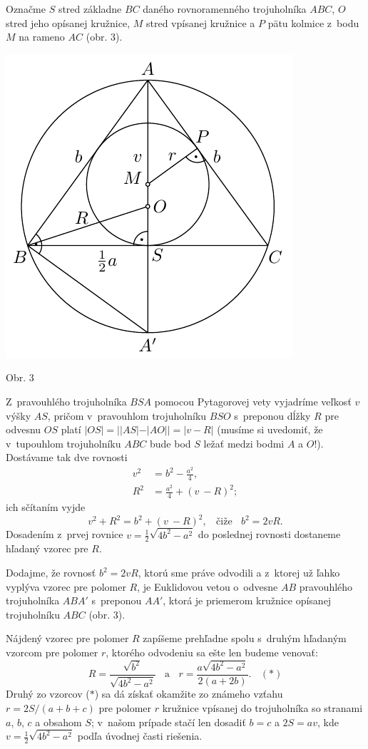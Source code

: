 \rieh Označme $S$ stred základne $BC$ daného rovnoramenného trojuholníka $ABC$, $O$ stred jeho opísanej kružnice, $M$ stred vpísanej kružnice a $P$ pätu kolmice z~bodu $M$ na rameno $AC$ (obr. 3).
\begin{center}
\includegraphics{obrazky/61D5}

Obr. 3
\end{center}
Z~pravouhlého trojuholníka $BSA$ pomocou Pytagorovej vety vyjadríme veľkosť $v$ výšky $AS$, pričom v~pravouhlom trojuholníku $BSO$ s~preponou dĺžky $R$ pre odvesnu $OS$ platí $|OS| =||AS|-|AO|| = |v-R|$ (musíme si uvedomiť, že v~tupouhlom trojuholníku $ABC$ bude bod $S$ ležať medzi bodmi $A$ a $O$!). Dostávame tak dve rovnosti
\begin{align*}
v^2 &= b^2 -\frac{a^2}{4},\\
R^2 &= \frac{a^2}{4}+ (v~-R)^2;
\end{align*}
ich sčítaním vyjde
$$v^2+ R^2= b^2 + (v~- R)^2,\ \ \ \ \text{čiže} \ \ \ \  b^2= 2vR.$$
Dosadením z~prvej rovnice $v =\frac{1}{2}\sqrt{4b^2- a^2}$ do poslednej rovnosti dostaneme hľadaný vzorec pre $R$.

Dodajme, že rovnosť $b^2 = 2vR$, ktorú sme práve odvodili a z~ktorej už ľahko vyplýva vzorec pre polomer $R$, je Euklidovou vetou o~odvesne $AB$ pravouhlého trojuholníka $ABA'$ s~preponou $AA'$, ktorá je priemerom kružnice opísanej trojuholníku $ABC$ (obr. 3).

Nájdený vzorec pre polomer $R$ zapíšeme prehľadne spolu s~druhým hľadaným vzorcom pre polomer $r$, ktorého odvodeniu sa ešte len budeme venovať:
$$R =\frac{\sqrt{b^2}}{\sqrt{4b^2 - a^2}}\ \ \ \ \text{a}\ \ \ \  r = \frac{a\sqrt{4b^2-a^2}}{2(a+2b)}.\ \ \ \  (\ast)$$
Druhý zo vzorcov ($\ast$) sa dá získať okamžite zo známeho vzťahu $r = 2S/(a + b + c)$ pre polomer $r$ kružnice vpísanej do trojuholníka so stranami $a$, $b$, $c$ a obsahom $S$;
v~našom prípade stačí len dosadiť $b = c$ a $2S = av$, kde $v = \frac{1}{2}\sqrt{4b^2 - a^2}$ podľa úvodnej časti riešenia.

